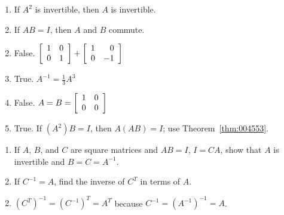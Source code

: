 \begin{multicols}{2}
\begin{ex}
\begin{enumerate}[label={\alph*.}]
\item If $A^{2}$ is invertible, then $A$ is invertible.

\item If $AB = I$, then $A$ and $B$ commute.

\end{enumerate}
\begin{sol}
\begin{enumerate}[label={\alph*.}]
\setcounter{enumi}{1}
\item  False. $\left[ \begin{array}{rr}
1 & 0 \\
0 & 1
\end{array} \right] + \left[ \begin{array}{rr}
1 & 0 \\
0 & -1
\end{array} \right]$

\setcounter{enumi}{3}
\item  True. $A^{-1} = \frac{1}{3}A^{3}$

\setcounter{enumi}{5}
\item  False. $A = B = \left[ \begin{array}{rr}
1 & 0 \\
0 & 0
\end{array} \right]$

\setcounter{enumi}{7}
\item  True. If $(A^{2})B = I$, then $A(AB) = I$; use Theorem~\ref{thm:004553}.

\end{enumerate}
\end{sol}
\end{ex}

\begin{ex} \label{ex:ex2_4_10}
\begin{enumerate}[label={\alph*.}]
\item If $A$, $B$, and $C$ are square matrices and $AB = I$, $ I = CA$, show that $A$ is invertible and $B = C = A^{-1}$.

\item If $C^{-1} = A$, find the inverse of $C^{T}$ in terms of $A$.

\end{enumerate}
\begin{sol}
\begin{enumerate}[label={\alph*.}]
\setcounter{enumi}{1}
\item  $(C^{T})^{-1} = (C^{-1})^{T} = A^{T}$ because $C^{-1} = (A^{-1})^{-1} = A$.


\end{enumerate}
\end{sol}
\end{ex}
\end{multicols}
